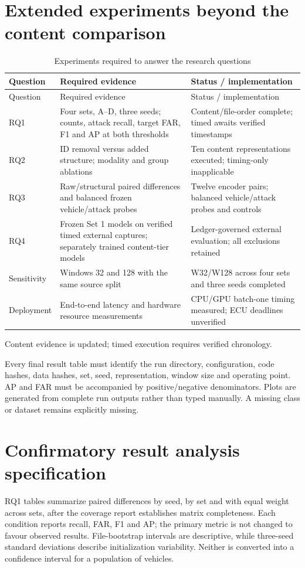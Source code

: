 \documentclass[12pt,a4paper,oneside,openany]{extbook}
\begin{document}
\section{Extended experiments beyond the content comparison}
\begin{longtable}{P{2.4cm}P{5.3cm}P{5.2cm}}
\caption{Experiments required to answer the research questions}\label{tab:pending}\\\toprule
Question & Required evidence & Status / implementation\\\midrule\endfirsthead
\toprule Question & Required evidence & Status / implementation\\\midrule\endhead
RQ1 & Four sets, A--D, three seeds; counts, attack recall, target FAR, F1 and AP at both thresholds & Content/file-order complete; timed awaits verified timestamps\\
RQ2 & ID removal versus added structure; modality and group ablations & Ten content representations executed; timing-only inapplicable\\
RQ3 & Raw/structural paired differences and balanced frozen vehicle/attack probes & Twelve encoder pairs; balanced vehicle/attack probes and controls\\
RQ4 & Frozen Set 1 models on verified timed external captures; separately trained content-tier models & Ledger-governed external evaluation; all exclusions retained\\
Sensitivity & Windows 32 and 128 with the same source split & W32/W128 across four sets and three seeds completed\\
Deployment & End-to-end latency and hardware resource measurements & CPU/GPU batch-one timing measured; ECU deadlines unverified\\\bottomrule
\end{longtable}
Content evidence is updated; timed execution requires verified chronology.

Every final result table must identify the run directory, configuration, code hashes, data hashes, set, seed, representation, window size and operating point. AP and FAR must be accompanied by positive/negative denominators. Plots are generated from complete run outputs rather than typed manually. A missing class or dataset remains explicitly missing.

\section{Confirmatory result analysis specification}
RQ1 tables summarize paired differences by seed, by set and with equal weight across sets, after the coverage report establishes matrix completeness. Each condition reports recall, FAR, F1 and AP; the primary metric is not changed to favour observed results. File-bootstrap intervals are descriptive, while three-seed standard deviations describe initialization variability. Neither is converted into a confidence interval for a population of vehicles.
\end{document}
